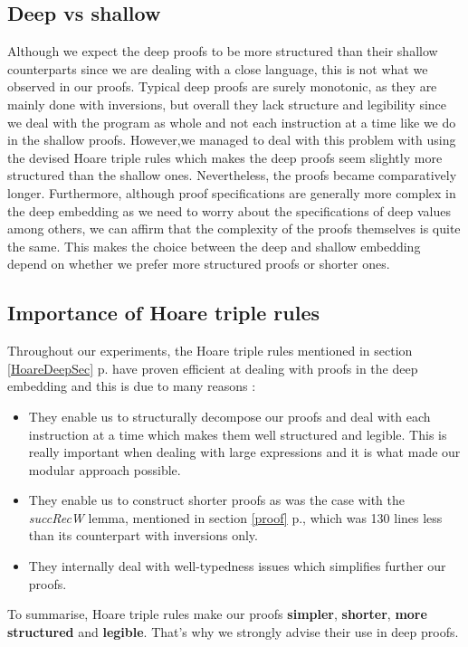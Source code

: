 \subsection{Deep vs shallow}
Although we expect the deep proofs to be more structured than their shallow counterparts since we are dealing with a close language, this is not what we observed in our proofs. Typical deep proofs are surely monotonic, as they are mainly done with inversions, but overall they lack structure and legibility since we deal with the program as whole and not each instruction at a time like we do in the shallow proofs. However,we managed to deal with this problem with using the devised Hoare triple rules which makes the deep proofs seem slightly more structured than the shallow ones. Nevertheless, the proofs became comparatively longer. Furthermore, although proof specifications are generally more complex in the deep embedding as we need to worry about the specifications of deep values among others, we can affirm that the complexity of the proofs  themselves is quite the same. This makes the choice between the deep and shallow embedding depend on whether we prefer more structured proofs or shorter ones.  

\subsection{Importance of Hoare triple rules} \label{HoareRules}
Throughout our experiments, the Hoare triple rules mentioned in section \ref{HoareDeepSec} p.\pageref{HoareDeepSec} have proven efficient at dealing with proofs in the deep embedding and this is due to many reasons :
\begin{itemize}
	\item They enable us to structurally decompose our proofs and deal with each instruction at a time which makes them well structured and legible. This is really important when dealing with large expressions and it is what made our modular approach possible.
	\item They enable us to construct shorter proofs as was the case with the \textit{succRecW} lemma, mentioned in section \ref{proof} p.\pageref{proof}, which was 130 lines less than its counterpart with inversions only. 
	\item They internally deal with well-typedness issues which simplifies further our proofs.
\end{itemize}

To summarise, Hoare triple rules make our proofs \textbf{simpler}, \textbf{shorter}, \textbf{more structured} and \textbf{legible}. That's why we strongly advise their use in deep proofs. 

